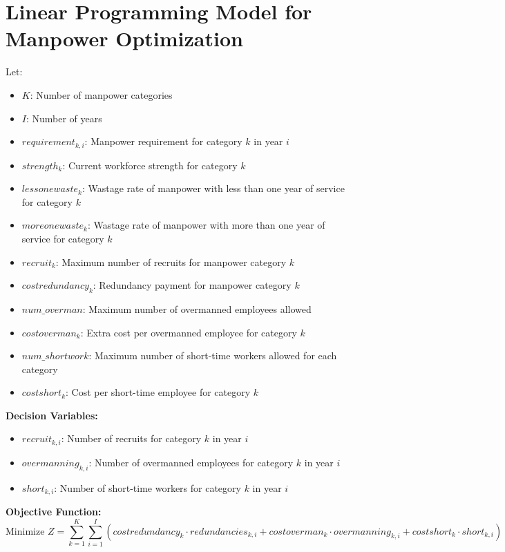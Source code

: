 \documentclass{article}
\begin{document}
\section*{Linear Programming Model for Manpower Optimization}

Let:
\begin{itemize}
    \item \( K \): Number of manpower categories
    \item \( I \): Number of years
    \item \( requirement_{k,i} \): Manpower requirement for category \( k \) in year \( i \)
    \item \( strength_{k} \): Current workforce strength for category \( k \)
    \item \( lessonewaste_{k} \): Wastage rate of manpower with less than one year of service for category \( k \)
    \item \( moreonewaste_{k} \): Wastage rate of manpower with more than one year of service for category \( k \)
    \item \( recruit_{k} \): Maximum number of recruits for manpower category \( k \)
    \item \( costredundancy_{k} \): Redundancy payment for manpower category \( k \)
    \item \( num\_overman \): Maximum number of overmanned employees allowed
    \item \( costoverman_{k} \): Extra cost per overmanned employee for category \( k \)
    \item \( num\_shortwork \): Maximum number of short-time workers allowed for each category
    \item \( costshort_{k} \): Cost per short-time employee for category \( k \)
\end{itemize}

\textbf{Decision Variables:}
\begin{itemize}
    \item \( recruit_{k,i} \): Number of recruits for category \( k \) in year \( i \)
    \item \( overmanning_{k,i} \): Number of overmanned employees for category \( k \) in year \( i \)
    \item \( short_{k,i} \): Number of short-time workers for category \( k \) in year \( i \)
\end{itemize}

\textbf{Objective Function:}
\[
\text{Minimize } Z = \sum_{k=1}^{K} \sum_{i=1}^{I} (costredundancy_{k} \cdot redundancies_{k,i} + costoverman_{k} \cdot overmanning_{k,i} + costshort_{k} \cdot short_{k,i})
\]
\end{document}

